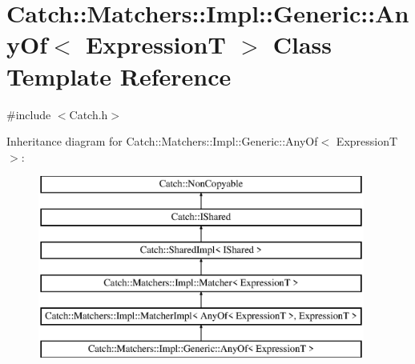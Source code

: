 \hypertarget{class_catch_1_1_matchers_1_1_impl_1_1_generic_1_1_any_of}{}\section{Catch\+:\+:Matchers\+:\+:Impl\+:\+:Generic\+:\+:Any\+Of$<$ ExpressionT $>$ Class Template Reference}
\label{class_catch_1_1_matchers_1_1_impl_1_1_generic_1_1_any_of}


{\ttfamily \#include $<$Catch.\+h$>$}

Inheritance diagram for Catch\+:\+:Matchers\+:\+:Impl\+:\+:Generic\+:\+:Any\+Of$<$ ExpressionT $>$\+:\begin{figure}[H]
\begin{center}
\leavevmode
\includegraphics[height=6.000000cm]{class_catch_1_1_matchers_1_1_impl_1_1_generic_1_1_any_of}
\end{center}
\end{figure}
